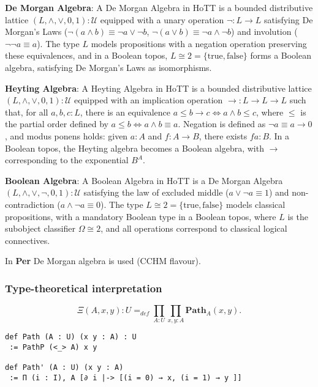 \documentclass{article}
\begin{document}
\textbf{De Morgan Algebra}: A De Morgan Algebra in HoTT is a bounded distributive lattice $(L, \wedge, \vee, 0, 1) : \mathcal{U}$ equipped with a unary operation $\neg : L \to L$ satisfying De Morgan’s Laws ($\neg (a \wedge b) \equiv \neg a \vee \neg b$, $\neg (a \vee b) \equiv \neg a \wedge \neg b$) and involution ($\neg \neg a \equiv a$). The type $L$ models propositions with a negation operation preserving these equivalences, and in a Boolean topos, $L \cong 2 = \{\text{true}, \text{false}\}$ forms a Boolean algebra, satisfying De Morgan’s Laws as isomorphisms.

\textbf{Heyting Algebra}: A Heyting Algebra in HoTT is a bounded distributive lattice $(L, \wedge, \vee, 0, 1) : \mathcal{U}$ equipped with an implication operation $\to : L \to L \to L$ such that, for all $a, b, c : L$, there is an equivalence $a \leq b \to c \iff a \wedge b \leq c$, where $\leq$ is the partial order defined by $a \leq b \iff a \wedge b \equiv a$. Negation is defined as $\neg a \equiv a \to 0$, and modus ponens holds: given $a : A$ and $f : A \to B$, there exists $f a : B$. In a Boolean topos, the Heyting algebra becomes a Boolean algebra, with $\to$ corresponding to the exponential $B^A$.

\textbf{Boolean Algebra}: A Boolean Algebra in HoTT is a De Morgan Algebra $(L, \wedge, \vee, \neg, 0, 1) : \mathcal{U}$ satisfying the law of excluded middle ($a \vee \neg a \equiv 1$) and non-contradiction ($a \wedge \neg a \equiv 0$). The type $L \cong 2 = \{\text{true}, \text{false}\}$ models classical propositions, with a mandatory Boolean type in a Boolean topos, where $L$ is the subobject classifier $\Omega \cong 2$, and all operations correspond to classical logical connectives.

In \textbf{Per} De Morgan algebra is used (CCHM flavour).

\subsubsection*{Type-theoretical interpretation}

\begin{definition}
$$
   \Xi(A,x,y) : U =_{def} \prod_{A:U}\prod_{x,y:A} \mathbf{Path}_A(x,y).
$$
\begin{lstlisting}
def Path (A : U) (x y : A) : U
 := PathP (<_> A) x y

def Path' (A : U) (x y : A)
 := Π (i : I), A [∂ i |-> [(i = 0) → x, (i = 1) → y ]]
\end{lstlisting}
\end{definition}
\end{document}
